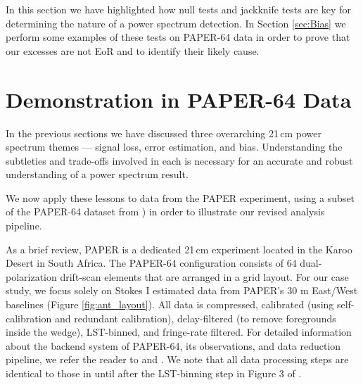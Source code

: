 \documentclass[preprint2,numberedappendix,tighten]{aastex6}  %
\begin{document}
In this section we have highlighted how null tests and jackknife tests are key for determining the nature of a power spectrum 
detection. In Section \ref{sec:Bias} we perform some examples of these tests on PAPER-64 data in order to prove that our 
excesses are not EoR and to identify their likely cause. 


\section{Demonstration in PAPER-64 Data}
\label{sec:CaseStudy}

In the previous sections we have discussed three overarching 21\,cm power spectrum themes --- signal loss, error estimation, 
and bias. Understanding the subtleties and trade-offs involved in each is necessary for an accurate and robust understanding of 
a power spectrum result. 

We now apply these lessons to data from the PAPER experiment, using a subset of the PAPER-64 dataset from
) in order to illustrate our revised analysis pipeline.

As a brief review, PAPER is a dedicated 21\,cm experiment located in the Karoo Desert in South Africa. The PAPER-64 
configuration consists of 64 dual-polarization drift-scan elements that are arranged in a grid layout. For our case study, we 
focus solely on Stokes I estimated data \citep{moore_et_al2013} from PAPER's $30$ m East/West baselines (Figure 
\ref{fig:ant_layout}). All data is compressed, calibrated (using self-calibration and redundant calibration), delay-filtered (to remove foregrounds inside the wedge), LST-binned, and fringe-rate filtered. For detailed information about the backend system of PAPER-64, its observations, and data reduction pipeline, we 
refer the reader to \citet{parsons_et_al2010} and . We note that all data processing steps are identical to those in  until after the LST-binning step in Figure 3 of .
\end{document}
